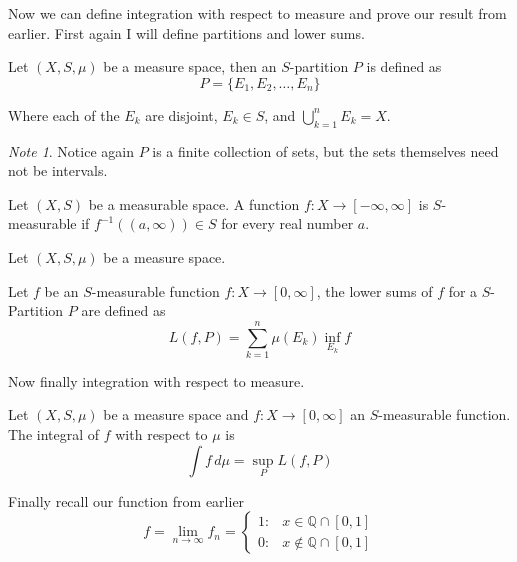 \documentclass[12pt]{article}
\theoremstyle{plain}
\theoremstyle{definition}
\theoremstyle{definition}
\theoremstyle{remark}
\newtheorem*{remark}{Note}
\begin{document}
Now we can define integration with respect to measure and prove our result from earlier.
First again I will define partitions and lower sums.

\begin{definition}[$S$-Partitions]
    Let $(X, S, \mu)$ be a measure space, then an $S$-partition $P$ is defined as
    \begin{equation}
        P = \{E_1, E_2, \ldots, E_n\}
    \end{equation}

    Where each of the $E_k$ are disjoint, $E_k \in S$, and $\bigcup_{k=1}^{n} E_k = X$.
\end{definition}

\begin{remark}
    Notice again $P$ is a finite collection of sets, but the sets themselves need not be intervals.
\end{remark}

\begin{definition}[S-Measurable]
    Let $(X, S)$ be a measurable space. A function $f \colon X \to [-\infty, \infty]$ is $S$-measurable
    if $f^{-1}((a, \infty)) \in S$ for every real number $a$. 
\end{definition}


\begin{definition}
    Let $(X, S, \mu)$ be a measure space.

    Let $f$ be an $S$-measurable function $f \colon X \to [0, \infty]$, the lower sums of
    $f$ for a $S$-Partition $P$ are defined as
    \begin{equation*}
        L(f, P) = \sum_{k=1}^{n} \mu(E_k) \inf_{E_k} f
    \end{equation*} 
\end{definition}

Now finally integration with respect to measure.

\begin{definition}
    Let $(X, S, \mu)$ be a measure space and $f \colon X \to [0, \infty]$ an $S$-measurable function.
    The integral of $f$ with respect to $\mu$ is
    \begin{equation}
        \int f \, d\mu = \sup_{P} L(f, P)
    \end{equation}
\end{definition}


Finally recall our function from earlier
\begin{equation*}
    f = \lim_{n \to \infty} f_n = \begin{cases}
                        1: & x \in \mathbb{Q} \cap [0, 1] \\
                        0: & x \not\in \mathbb{Q} \cap [0, 1]
                        \end{cases}
\end{equation*}
\end{document}
